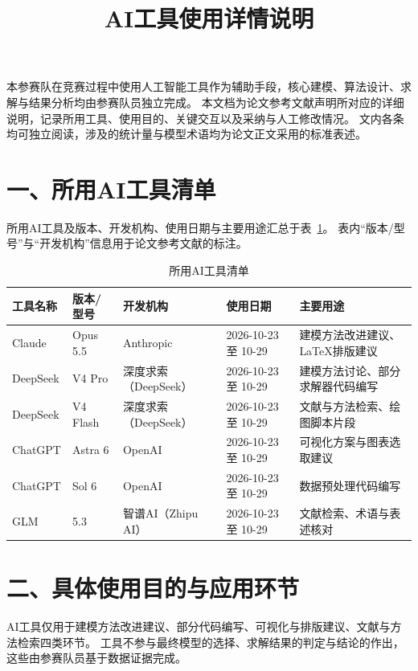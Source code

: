 \documentclass[11pt,a4paper]{article}
\title{\bfseries AI工具使用详情说明}
\author{}
\date{}
\begin{document}
\maketitle

本参赛队在竞赛过程中使用人工智能工具作为辅助手段，核心建模、算法设计、求解与结果分析均由参赛队员独立完成。
本文档为论文参考文献声明所对应的详细说明，记录所用工具、使用目的、关键交互以及采纳与人工修改情况。
文内各条均可独立阅读，涉及的统计量与模型术语均为论文正文采用的标准表述。

\section*{一、所用AI工具清单}

所用AI工具及版本、开发机构、使用日期与主要用途汇总于表~\ref{tab:tools}。
表内“版本/型号”与“开发机构”信息用于论文参考文献的标注。

\begin{table}[H]
  \centering\footnotesize
  \setlength{\tabcolsep}{4pt}
  \renewcommand{\arraystretch}{1.3}
  \caption{所用AI工具清单}
  \label{tab:tools}
  \begin{tabular}{p{1.8cm}p{2.2cm}p{3.0cm}p{2.6cm}p{4.9cm}}
    \toprule
    工具名称 & 版本/型号 & 开发机构 & 使用日期 & 主要用途 \\
    \midrule
    Claude & Opus 5.5 & Anthropic & 2026-10-23 至 10-29 & 建模方法改进建议、LaTeX排版建议 \\
    DeepSeek & V4 Pro & 深度求索（DeepSeek） & 2026-10-23 至 10-29 & 建模方法讨论、部分求解器代码编写 \\
    DeepSeek & V4 Flash & 深度求索（DeepSeek） & 2026-10-23 至 10-29 & 文献与方法检索、绘图脚本片段 \\
    ChatGPT & Astra 6 & OpenAI & 2026-10-23 至 10-29 & 可视化方案与图表选取建议 \\
    ChatGPT & Sol 6 & OpenAI & 2026-10-23 至 10-29 & 数据预处理代码编写 \\
    GLM & 5.3 & 智谱AI（Zhipu AI） & 2026-10-23 至 10-29 & 文献检索、术语与表述核对 \\
    \bottomrule
  \end{tabular}
\end{table}

\section*{二、具体使用目的与应用环节}

AI工具仅用于建模方法改进建议、部分代码编写、可视化与排版建议、文献与方法检索四类环节。
工具不参与最终模型的选择、求解结果的判定与结论的作出，这些由参赛队员基于数据证据完成。
\end{document}
